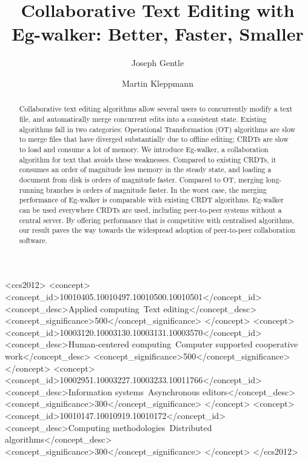 \documentclass[sigplan,10pt]{acmart}
\newcommand{\algname}{Eg-walker\xspace}
\begin{document}
\def\sectionautorefname{Section}%
\def\subsectionautorefname{Section}%
\def\subsubsectionautorefname{Section}%

\title{Collaborative Text Editing with Eg-walker: Better, Faster, Smaller}
\author{Joseph Gentle}

\author{Martin Kleppmann}

\begin{abstract}
  Collaborative text editing algorithms allow several users to concurrently modify a text file, and automatically merge concurrent edits into a consistent state.
  Existing algorithms fall in two categories: Operational Transformation (OT) algorithms are slow to merge files that have diverged substantially due to offline editing; CRDTs are slow to load and consume a lot of memory.
  We introduce \algname, a collaboration algorithm for text that avoids these weaknesses.
  Compared to existing CRDTs, it consumes an order of magnitude less memory in the steady state, and loading a document from disk is orders of magnitude faster.
  Compared to OT, merging long-running branches is orders of magnitude faster.
  In the worst case, the merging performance of \algname is comparable with existing CRDT algorithms.
  \algname can be used everywhere CRDTs are used, including peer-to-peer systems without a central server.
  By offering performance that is competitive with centralised algorithms, our result paves the way towards the widespread adoption of peer-to-peer collaboration software.
\end{abstract}

\begin{CCSXML}
  <ccs2012>
    <concept>
      <concept_id>10010405.10010497.10010500.10010501</concept_id>
      <concept_desc>Applied computing~Text editing</concept_desc>
      <concept_significance>500</concept_significance>
    </concept>
    <concept>
      <concept_id>10003120.10003130.10003131.10003570</concept_id>
      <concept_desc>Human-centered computing~Computer supported cooperative work</concept_desc>
      <concept_significance>500</concept_significance>
    </concept>
    <concept>
      <concept_id>10002951.10003227.10003233.10011766</concept_id>
      <concept_desc>Information systems~Asynchronous editors</concept_desc>
      <concept_significance>300</concept_significance>
    </concept>
    <concept>
      <concept_id>10010147.10010919.10010172</concept_id>
      <concept_desc>Computing methodologies~Distributed algorithms</concept_desc>
      <concept_significance>300</concept_significance>
    </concept>
  </ccs2012>
\end{CCSXML}
\end{document}
